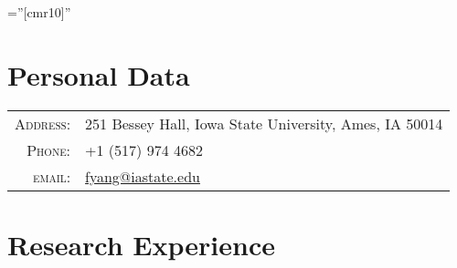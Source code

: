 \documentclass[letterpaper,10pt]{article} %
\begin{document}
\pagestyle{empty} %

\font\fb=''[cmr10]'' %


\par{\bigskip\par} %

\section{Personal Data}

\begin{tabular}{rl}
\textsc{Address:} & 251 Bessey Hall, Iowa State University, Ames, IA 50014\\
\textsc{Phone:} & +1 (517) 974 4682\\
\textsc{email:} & \href{mailto:fyang@iastate.edu}{fyang@iastate.edu}
\end{tabular}


\section{Research Experience}
\end{document}
